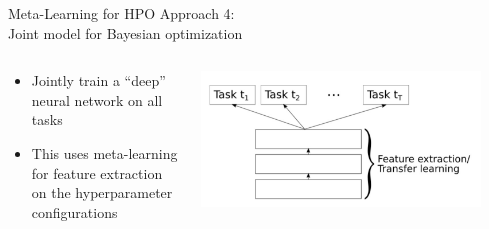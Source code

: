 \begin{frame}[c]{Meta-Learning for HPO Approach 4:\\ Joint model for Bayesian optimization}

\begin{columns}[T] %
\begin{column}{.38\textwidth}

\begin{itemize}
    \item<1-> \alert{Jointly train} a ``deep'' neural network \alert{on all tasks} 
    \item<3-> This uses meta-learning for feature extraction on the hyperparameter configurations 
\end{itemize}
\end{column}%

\hfill%

\begin{column}{.58\textwidth}
\includegraphics[width=0.9\textwidth]{../w07_hpo_speedup/images/meta_learning/perrone_int.jpg}
\end{column}%
\end{columns}

\hspace{12cm}

\end{frame}
%
%

